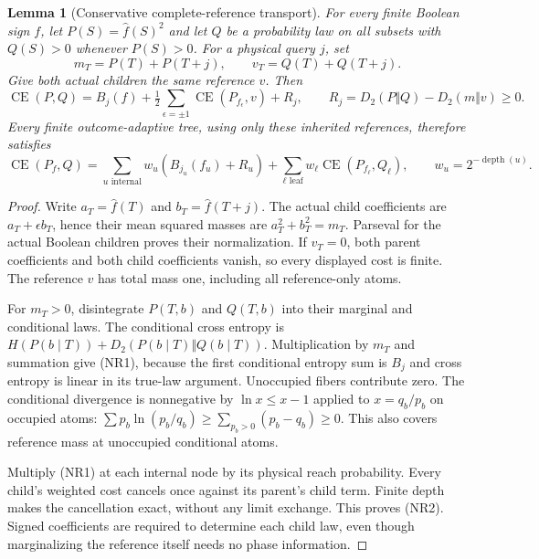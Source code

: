 \documentclass[11pt]{article}
\newtheorem{lemma}{Lemma}
\newcommand{\CE}{\operatorname{CE}}
\begin{document}
\begin{lemma}[Conservative complete-reference transport]
For every finite Boolean sign $f$, let $P(S)=\widehat f(S)^2$ and
let $Q$ be a probability law on all subsets with $Q(S)>0$ whenever
$P(S)>0$. For a physical query $j$, set
\[
 m_T=P(T)+P(T+j),\qquad v_T=Q(T)+Q(T+j).
\]
Give both actual children the same reference $v$. Then
\[
 \CE(P,Q)=B_j(f)+\tfrac12\sum_{\epsilon=\pm1}
                  \CE(P_{f_\epsilon},v)+R_j,
 \qquad R_j=D_2(P\Vert Q)-D_2(m\Vert v)\ge0.
 \tag{NR1}
\]
Every finite outcome-adaptive tree, using only these inherited
references, therefore satisfies
\[
 \CE(P_f,Q)=\sum_{u\text{ internal}}w_u(B_{j_u}(f_u)+R_u)
                  +\sum_{\ell\text{ leaf}}w_\ell\CE(P_{f_\ell},Q_\ell),
 \qquad w_u=2^{-\operatorname{depth}(u)}.
 \tag{NR2}
\]
\end{lemma}
\begin{proof}
Write $a_T=\widehat f(T)$ and $b_T=\widehat f(T+j)$.
The actual child coefficients are $a_T+\epsilon b_T$, hence their
mean squared masses are $a_T^2+b_T^2=m_T$. Parseval for the actual
Boolean children proves their normalization. If $v_T=0$, both
parent coefficients and both child coefficients vanish, so every
displayed cost is finite. The reference $v$ has total mass one,
including all reference-only atoms.

For $m_T>0$, disintegrate $P(T,b)$ and $Q(T,b)$ into their
marginal and conditional laws. The conditional cross entropy is
$H(P(b\mid T))+D_2(P(b\mid T)\Vert Q(b\mid T))$.
Multiplication by $m_T$ and summation give (NR1), because the first
conditional entropy sum is $B_j$ and cross entropy is linear in
its true-law argument. Unoccupied fibers contribute zero.
The conditional divergence is nonnegative by
$\ln x\le x-1$ applied to $x=q_b/p_b$ on occupied atoms:
$\sum p_b\ln(p_b/q_b)\ge\sum_{p_b>0}(p_b-q_b)\ge0$.
This also covers reference mass at unoccupied conditional atoms.

Multiply (NR1) at each internal node by its physical reach
probability. Every child's weighted cost cancels once against
its parent's child term. Finite depth makes the cancellation exact,
without any limit exchange. This proves (NR2). Signed coefficients
are required to determine each child law, even though marginalizing
the reference itself needs no phase information.
\end{proof}
\end{document}
